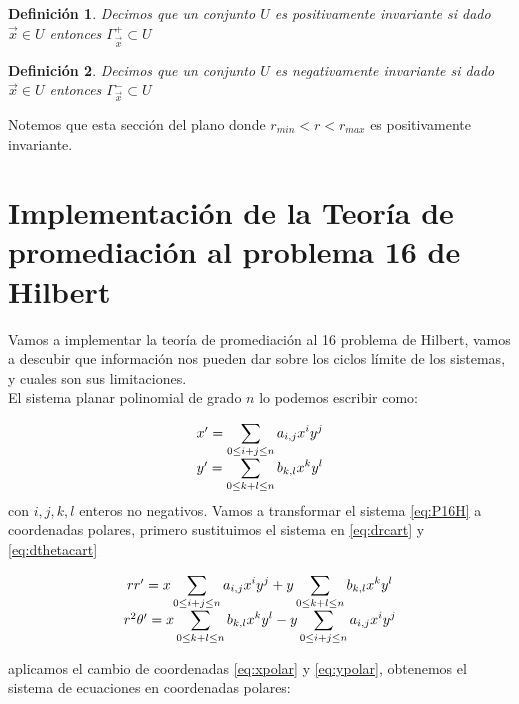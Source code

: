 \documentclass[12pt, a4paper]{report}
\newtheorem{definition}{Definición}
\begin{document}
\begin{definition}
	Decimos que un conjunto $U$ es positivamente invariante si dado $\vec{x}\in U$ entonces  $\varGamma_{\vec{x}}^{+}\subset U$
\end{definition}

\begin{definition}
	Decimos que un conjunto $U$ es negativamente invariante si dado $\vec{x}\in U$ entonces  $\varGamma_{\vec{x}}^{-}\subset U$
\end{definition}

Notemos que esta sección del plano donde $r_{min}<r<r_{max}$ es positivamente invariante.
\newpage


\chapter{Implementación de la Teoría de promediación al problema 16 de Hilbert}

Vamos a implementar la teoría de promediación al 16 problema de Hilbert, vamos a descubir que información nos pueden dar sobre los ciclos límite de los sistemas, y cuales son sus limitaciones.\\

El sistema planar polinomial de grado $n$ lo podemos escribir como:

\begin{equation}\label{eq:P16H}
	\begin{matrix}
		x' =\displaystyle\large\sum_{0\leq i+j\leq n}a_{i,j}x^iy^j \\
		y' =\displaystyle\large\sum_{0\leq k+l\leq n}b_{k,l}x^ky^l 
	\end{matrix}
\end{equation}
con $i,j,k,l$ enteros no negativos. Vamos a transformar el sistema \eqref{eq:P16H} a coordenadas polares, primero sustituimos el sistema en \eqref{eq:drcart} y \eqref{eq:dthetacart}

\[
\begin{matrix}
	rr'=x\displaystyle\large\sum_{0\leq i+j\leq n}a_{i,j}x^iy^j +y \displaystyle\large\sum_{0\leq k+l\leq n}b_{k,l}x^ky^l \\
	r^2\theta' = x\displaystyle\large\sum_{0\leq k+l\leq n}b_{k,l}x^ky^l  -y\displaystyle\large\sum_{0\leq i+j\leq n}a_{i,j}x^iy^j 
\end{matrix}
\]

aplicamos el cambio de coordenadas \eqref{eq:xpolar} y \eqref{eq:ypolar}, obtenemos el sistema de ecuaciones en coordenadas polares:
\end{document}
